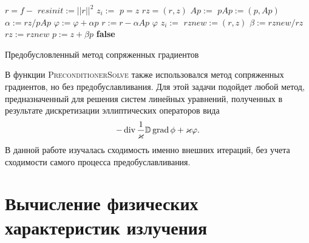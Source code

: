 \begin{algorithm}[ht!]
\centering
\begin{algorithmic}[1]
\State $r = f - $ 
\State $resinit := ||r||^2$
\State $z_i := $ 
\EndFor
\State $p = z$
\State $rz = (r, z)$
\Repeat
\State $Ap := $ 
\State $pAp := (p, Ap)$
\State $\alpha := {rz}/{pAp}$
\State $\varphi := \varphi + \alpha p$
\State $r := r - \alpha Ap$
\State \Return $\varphi$
\EndIf
{} 
\State $z_i := $ 
\EndFor
\State $rznew := (r, z)$
\State $\beta := {rznew}/{rz}$
\State $rz := rznew$
\State $p := z + \beta p$
\Until \textbf{false}
\EndFunction
\end{algorithmic}
\caption{Предобусловленный метод сопряженных градиентов}
\label{alg:precondcgs}
\end{algorithm}

В функции \textsc{PreconditionerSolve} также использовался метод сопряженных градиентов, но без предобуславливания. Для этой задачи подойдет любой метод, предназначенный для решения систем линейных уравнений, полученных в результате дискретизации эллиптических операторов вида
\[
-\operatorname{div} \frac{1}{\varkappa} \mathbb D \operatorname{grad} \phi + \varkappa \varphi.
\]
В данной работе изучалась сходимость именно внешних итераций, без учета сходимости самого процесса предобуславливания. 

\section{Вычисление физических характеристик излучения}

